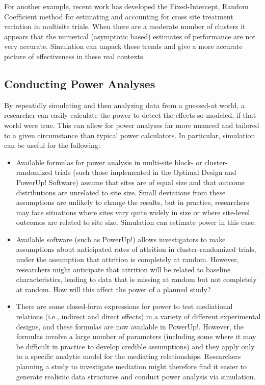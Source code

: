 \documentclass[
]{book}
\begin{document}
For another example, recent work has developed the Fixed-Intercept, Random Coefficient method for estimating and accounting for cross site treatment variation in multisite trials. When there are a moderate number of clusters it appears that the numerical (asymptotic based) estimates of performance are not very accurate. Simulation can unpack these trends and give a more accurate picture of effectiveness in these real contexts.

\hypertarget{conducting-power-analyses}{%
\subsection{Conducting Power Analyses}\label{conducting-power-analyses}}

By repeatidly simulating and then analyzing data from a guessed-at world, a researcher can easily calculate the power to detect the effects so modeled, if that world were true.
This can allow for power analyses far more nuanced and tailored to a given circumstance than typical power calculators. In particular, simulation can be useful for the following:

\begin{itemize}
\item
  Available formulas for power analysis in multi-site block- or cluster-randomized trials (such those implemented in the Optimal Design and PowerUp! Software) assume that sites are of equal size and that outcome distributions are unrelated to site size. Small deviations from these assumptions are unlikely to change the results, but in practice, researchers may face situations where sites vary quite widely in size or where site-level outcomes are related to site size. Simulation can estimate power in this case.
\item
  Available software (such as PowerUp!) allows investigators to make assumptions about anticipated rates of attrition in cluster-randomized trials, under the assumption that attrition is completely at random. However, researchers might anticipate that attrition will be related to baseline characteristics, leading to data that is missing at random but not completely at random. How will this affect the power of a planned study?
\item
  There are some closed-form expressions for power to test mediational relations (i.e., indirect and direct effects) in a variety of different experimental designs, and these formulas are now available in PowerUp!. However, the formulas involve a large number of parameters (including some where it may be difficult in practice to develop credible assumptions) and they apply only to a specific analytic model for the mediating relationships. Researchers planning a study to investigate mediation might therefore find it easier to generate realistic data structures and conduct power analysis via simulation.
\end{itemize}
\end{document}
